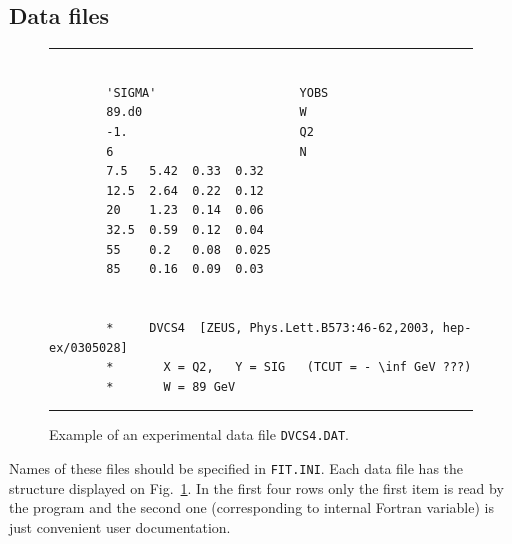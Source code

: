 \documentclass[12pt]{article}
\begin{document}
\subsection{Data files}

\begin{figure}[t]
\begin{center}
\hrule
\begin{verbatim}

        'SIGMA'                    YOBS
        89.d0                      W
        -1.                        Q2
        6                          N
        7.5   5.42  0.33  0.32 
        12.5  2.64  0.22  0.12 
        20    1.23  0.14  0.06 
        32.5  0.59  0.12  0.04 
        55    0.2   0.08  0.025 
        85    0.16  0.09  0.03


        *     DVCS4  [ZEUS, Phys.Lett.B573:46-62,2003, hep-ex/0305028]
        *       X = Q2,   Y = SIG   (TCUT = - \inf GeV ???)
        *       W = 89 GeV

\end{verbatim}
\hrule
\end{center}
\caption{Example of an experimental data file \texttt{DVCS4.DAT}.}
\label{fig:DVCS4.DAT}
\end{figure}

Names of these files should be specified in \texttt{FIT.INI}.
Each data file has the structure displayed on Fig.~\ref{fig:DVCS4.DAT}. In the first
four rows only the first item is read by the program and the second one
(corresponding to internal Fortran variable) is just convenient user
documentation.
\end{document}
